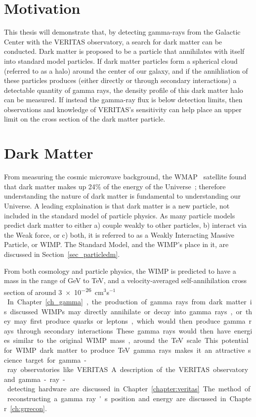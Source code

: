 \section{Motivation}
  This thesis will demonstrate that, by detecting gamma-rays from the Galactic Center with the VERITAS observatory, a search for dark matter can be conducted.
  Dark matter is proposed to be a particle that annihilates with itself into standard model particles.
  If dark matter particles form a spherical cloud (referred to as a halo) around the center of our galaxy, and if the annihliation of these particles produces (either directly or through secondary interactions) a detectable quantity of gamma rays, the density profile of this dark matter halo can be measured.
  If instead the gamma-ray flux is below detection limits, then observations and knowledge of VERITAS's sensitivity can help place an upper limit on the cross section of the dark matter particle.

\section{Dark Matter}

  From measuring the cosmic microwave background, the WMAP~\cite{wmap9year_obs} satellite found that dark matter makes up 24\% of the energy of the Universe~\cite{pdg_2012}; therefore understanding the nature of dark matter is fundamental to understanding our Universe.
  A leading explaination is that dark matter is a new particle, not included in the standard model of particle physics.
  As many particle models predict dark matter to either a) couple weakly to other particles, b) interact via the Weak force, or c) both, it is referred to as a Weakly Interacting Massive Particle, or WIMP.
  The Standard Model, and the WIMP's place in it, are discussed in Section~\ref{sec_particledm}.

  From both cosmology and particle physics, the WIMP is predicted to have a mass in the range of GeV to TeV, and a velocity-averaged self-annihilation cross section of around \nicetilde{}\SI{3e-26}{cm${}^3$s${}^{-1}$}.
  In Chapter~\ref{ch_gamma}, the production of gamma rays from dark matter is discussed.
  WIMPs may directly annihilate or decay into gamma rays, or they may first produce quarks or leptons, which would then produce gamma rays through secondary interactions.
  These gamma rays would then have energies similar to the original WIMP mass, around the TeV scale.
  This potential for WIMP dark matter to produce TeV gamma rays makes it an attractive science target for gamma-ray observatories like VERITAS.
  A description of the VERITAS observatory and gamma-ray-detecting hardware are discussed in Chapter~\ref{chapter:veritas}.
  The method of reconstructing a gamma ray's position and energy are discussed in Chapter~\ref{ch:grrecon}.

